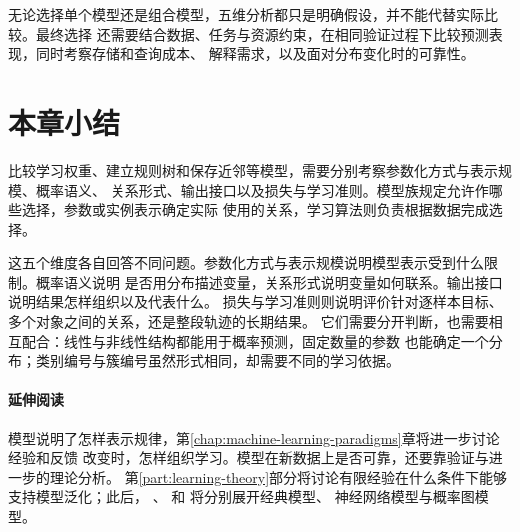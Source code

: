 无论选择单个模型还是组合模型，五维分析都只是明确假设，并不能代替实际比较。最终选择
还需要结合数据、任务与资源约束，在相同验证过程下比较预测表现，同时考察存储和查询成本、
解释需求，以及面对分布变化时的可靠性。

\section{本章小结}
\label{sec:models-summary}

比较学习权重、建立规则树和保存近邻等模型，需要分别考察参数化方式与表示规模、概率语义、
关系形式、输出接口以及损失与学习准则。模型族规定允许作哪些选择，参数或实例表示确定实际
使用的关系，学习算法则负责根据数据完成选择。

这五个维度各自回答不同问题。参数化方式与表示规模说明模型表示受到什么限制。概率语义说明
是否用分布描述变量，关系形式说明变量如何联系。输出接口说明结果怎样组织以及代表什么。
损失与学习准则则说明评价针对逐样本目标、多个对象之间的关系，还是整段轨迹的长期结果。
它们需要分开判断，也需要相互配合：线性与非线性结构都能用于概率预测，固定数量的参数
也能确定一个分布；类别编号与簇编号虽然形式相同，却需要不同的学习依据。

\paragraph{延伸阅读}

模型说明了怎样表示规律，第\ref{chap:machine-learning-paradigms}章将进一步讨论经验和反馈
改变时，怎样组织学习。模型在新数据上是否可靠，还要靠验证与进一步的理论分析。
第\ref{part:learning-theory}部分将讨论有限经验在什么条件下能够支持模型泛化；此后，
、
和
将分别展开经典模型、
神经网络模型与概率图模型。
